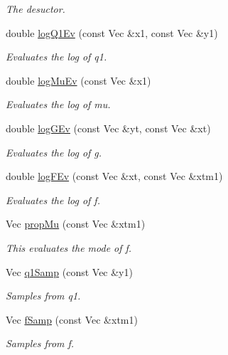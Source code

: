 \begin{DoxyCompactItemize}
\begin{DoxyCompactList}\small\item\em The desuctor. \end{DoxyCompactList}\item 
double \hyperlink{classSVolAPFFilter_ade59e30d3d1517a0c64fc44bc027d53c}{log\+Q1\+Ev} (const Vec \&x1, const Vec \&y1)
\begin{DoxyCompactList}\small\item\em Evaluates the log of q1. \end{DoxyCompactList}\item 
double \hyperlink{classSVolAPFFilter_ac019751d65847aabfb4a5b4cdcfbcf4c}{log\+Mu\+Ev} (const Vec \&x1)
\begin{DoxyCompactList}\small\item\em Evaluates the log of mu. \end{DoxyCompactList}\item 
double \hyperlink{classSVolAPFFilter_ac0b9ba8b7fcb918c011bb662f3306d19}{log\+G\+Ev} (const Vec \&yt, const Vec \&xt)
\begin{DoxyCompactList}\small\item\em Evaluates the log of g. \end{DoxyCompactList}\item 
double \hyperlink{classSVolAPFFilter_a575cd624bfc47497ac32213627df6a65}{log\+F\+Ev} (const Vec \&xt, const Vec \&xtm1)
\begin{DoxyCompactList}\small\item\em Evaluates the log of f. \end{DoxyCompactList}\item 
Vec \hyperlink{classSVolAPFFilter_a5a5d8ac387f71cb64d8da66c38bbff71}{prop\+Mu} (const Vec \&xtm1)
\begin{DoxyCompactList}\small\item\em This evaluates the mode of f. \end{DoxyCompactList}\item 
Vec \hyperlink{classSVolAPFFilter_a9da55ac2cfbc51ce0bc65a335942b1b6}{q1\+Samp} (const Vec \&y1)
\begin{DoxyCompactList}\small\item\em Samples from q1. \end{DoxyCompactList}\item 
Vec \hyperlink{classSVolAPFFilter_a3e24042d1c2763c80fe56ab9a5359aac}{f\+Samp} (const Vec \&xtm1)
\begin{DoxyCompactList}\small\item\em Samples from f. \end{DoxyCompactList}\end{DoxyCompactItemize}


